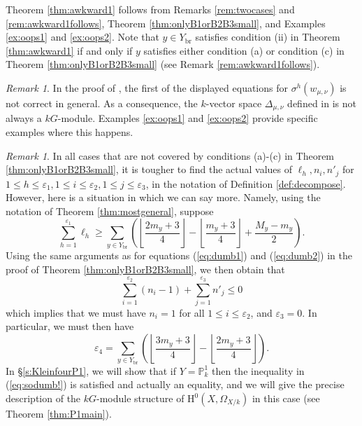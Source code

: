 \documentclass{amsart}
\numberwithin{equation}{section}
\numberwithin{table}{section}
\theoremstyle{plain}
\theoremstyle{definition}
\theoremstyle{remark}
\newtheorem{remark}[theorem]{Remark}
\newcommand{\HH}{\mathrm{H}}
\begin{document}
Theorem \ref{thm:awkward1} follows from Remarks \ref{rem:twocases} and \ref{rem:awkward1follows}, Theorem \ref{thm:onlyB1orB2B3small}, and Examples \ref{ex:oops1} and \ref{ex:oops2}. Note that $y\in Y_{\mathrm{br}}$ satisfies condition (ii) in Theorem \ref{thm:awkward1} if and only if  $y$ satisfies either condition (a) or condition (c) in Theorem \ref{thm:onlyB1orB2B3small} (see Remark \ref{rem:awkward1follows}). 


\begin{remark}
\label{rem:wrongMarquesWard}
In the proof of \cite[Lemma 6.3]{MarquesWard2018}, the first of the displayed equations for $\sigma^h(w_{\mu,\nu})$ is not correct in general. As a consequence, the $k$-vector space $\Delta_{\mu,\nu}$ defined in \cite[Theorem 6.4]{MarquesWard2018} is not always a $kG$-module. 
Examples \ref{ex:oops1} and \ref{ex:oops2} provide specific examples where this happens.
\end{remark}

\begin{remark}
\label{rem:candomore}
In all cases that are not covered by conditions (a)-(c) in Theorem \ref{thm:onlyB1orB2B3small}, it is tougher to find the actual values of $\ell_h, n_i, n'_j$ for $1\le h \le \varepsilon_1,1\le i\le \varepsilon_2,1\le j\le \varepsilon_3$, in the notation of Definition \ref{def:decompose}. However, here is a situation in which we can say more. Namely, using the notation of Theorem \ref{thm:mostgeneral}, suppose
\begin{equation}
\label{eq:sodumb!}
\sum_{h=1}^{\varepsilon_1} \ell_h \ge \sum_{y\in Y_{\mathrm{br}}} \left( \textstyle{\left\lfloor \frac{2m_y+3}{4}\right\rfloor} - \textstyle{\left\lfloor \frac{m_y+3}{4}\right\rfloor} + \textstyle{\frac{M_y-m_y}{2}}\right).
\end{equation}
Using the same arguments as for equations (\ref{eq:dumb1}) and (\ref{eq:dumb2}) in the proof of Theorem \ref{thm:onlyB1orB2B3small}, we then obtain that
$$ \sum_{i=1}^{\varepsilon_2} (n_i-1) +\sum_{j=1}^{\varepsilon_3} n'_j \le 0$$
which implies that we must have $n_i=1$ for all $1\le i\le \varepsilon_2$, and $\varepsilon_3=0$. In particular, we must then have 
$$\varepsilon_4 = \displaystyle \sum_{y\in Y_{\mathrm{br}}} \left(\left\lfloor \frac{3m_y+3}{4}\right\rfloor - \left\lfloor \frac{2m_y+3}{4}\right\rfloor\right).$$
In \S \ref{s:KleinfourP1}, we will show that if $Y=\mathbb{P}^1_k$ then the inequality in (\ref{eq:sodumb!}) is satisfied and actually an equality, and we will give the precise description of the $kG$-module structure of $\HH^0(X,\Omega_{X/k})$ in this case (see Theorem \ref{thm:P1main}). 
\end{remark}
\end{document}

